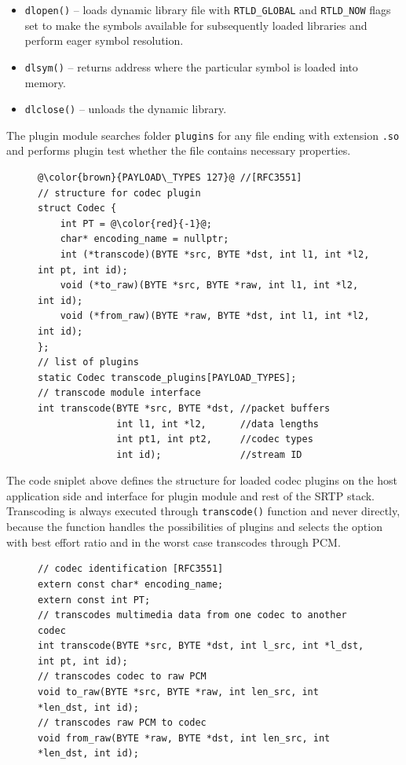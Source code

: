 \begin{itemize}
\item \texttt{dlopen()} -- loads dynamic library file with \texttt{RTLD\_GLOBAL}
and \texttt{RTLD\_NOW} flags set to make the symbols available for subsequently 
loaded libraries and perform eager symbol resolution. 
\item \texttt{dlsym()} -- returns address where the particular symbol is loaded
into memory.
\item \texttt{dlclose()} -- unloads the dynamic library.
\end{itemize}

The plugin module searches folder \texttt{plugins} for any file ending with 
extension \texttt{.so} and performs plugin test whether the file contains
necessary properties.

\begin{figure}[H]
\begin{lstlisting}
@\color{brown}{PAYLOAD\_TYPES 127}@ //[RFC3551]
// structure for codec plugin
struct Codec {
    int PT = @\color{red}{-1}@;
    char* encoding_name = nullptr;
    int (*transcode)(BYTE *src, BYTE *dst, int l1, int *l2, int pt, int id);
    void (*to_raw)(BYTE *src, BYTE *raw, int l1, int *l2, int id);
    void (*from_raw)(BYTE *raw, BYTE *dst, int l1, int *l2, int id);
};
// list of plugins
static Codec transcode_plugins[PAYLOAD_TYPES];
// transcode module interface
int transcode(BYTE *src, BYTE *dst, //packet buffers 
              int l1, int *l2,      //data lengths
              int pt1, int pt2,     //codec types
              int id);              //stream ID
\end{lstlisting}
\end{figure}

The code sniplet above defines the structure for loaded codec plugins on the 
host application side and interface for plugin module and rest of the SRTP 
stack. Transcoding is always executed through \texttt{transcode()} function and
never directly, because the function handles the possibilities of plugins
and selects the option with best effort ratio and in the worst case transcodes
through PCM.

\begin{figure}[H]
\begin{lstlisting}
// codec identification [RFC3551]
extern const char* encoding_name;
extern const int PT;
// transcodes multimedia data from one codec to another codec
int transcode(BYTE *src, BYTE *dst, int l_src, int *l_dst, int pt, int id);
// transcodes codec to raw PCM
void to_raw(BYTE *src, BYTE *raw, int len_src, int *len_dst, int id);
// transcodes raw PCM to codec
void from_raw(BYTE *raw, BYTE *dst, int len_src, int *len_dst, int id);
\end{lstlisting}
\end{figure}

